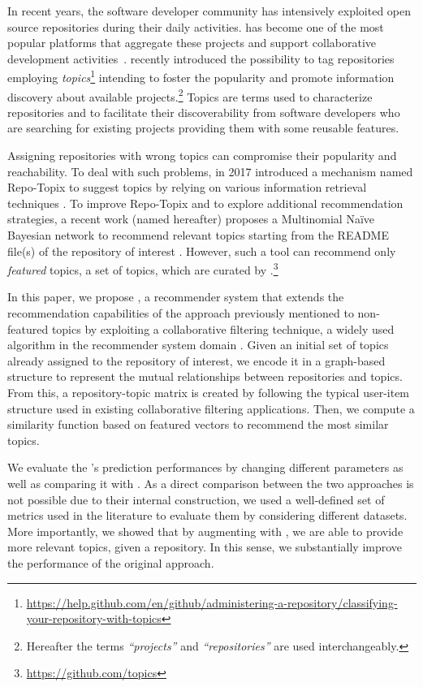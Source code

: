 In recent years, the software developer community has intensively exploited open source 
repositories during their daily activities. \GH has become one of the most
popular platforms that aggregate these projects and support collaborative 
development activities~\cite{7832894}. \GH recently introduced the possibility 
to tag repositories employing 
\emph{topics}\footnote{\url{https://help.github.com/en/github/administering-a-repository/classifying-your-repository-with-topics}}
 intending to foster the popularity and promote information discovery about 
available projects.\footnote{Hereafter the terms \GH  \emph{``projects''} and \emph{``repositories''} 
are used 
interchangeably.} Topics are terms used to characterize repositories and to 
facilitate their discoverability from software developers who are searching 
for existing projects providing them with some reusable features. 

Assigning repositories with wrong topics can compromise their popularity and 
reachability. To deal with such problems, in 2017 \GH introduced a 
mechanism named Repo-Topix to suggest topics by relying on various information 
retrieval techniques \cite{repo-topix}. To improve Repo-Topix 
and to explore additional recommendation strategies, a recent work (named \MNB 
hereafter) proposes a Multinomial Na\"ive Bayesian network to 
recommend relevant topics starting from the README file(s) of the repository of 
interest \cite{10.1145/3383219.3383227}. However, such a tool can recommend 
only \emph{featured} topics, \ie a set of topics, which are curated by 
\GH.\footnote{\url{https://github.com/topics}}


In this paper, we propose \TF, a recommender system that extends the 
recommendation capabilities of the \MNB approach previously mentioned to 
non-featured topics by exploiting a collaborative filtering technique, a widely used 
algorithm in the recommender system domain 
\cite{Schafer:2007:CFR:1768197.1768208}. Given an initial set of topics already 
assigned to the \GH repository of interest, we encode it in a graph-based 
structure to represent the mutual relationships between repositories and 
topics. From this, a repository-topic matrix is created by following the 
typical user-item structure used in existing collaborative filtering 
applications. Then, we compute a similarity function based on featured vectors 
to recommend the most similar topics.

We evaluate the \TF's prediction performances by changing different parameters 
as well as comparing it with \MNB. As a direct comparison between the two approaches %
is not
possible due to their internal construction, 
we used a well-defined set of metrics used in the literature to evaluate them by 
considering different datasets. More importantly, we showed that by augmenting \MNB with \TF, we are able to provide more relevant topics, given a repository. In this sense, we substantially improve the performance of the original \MNB approach.

